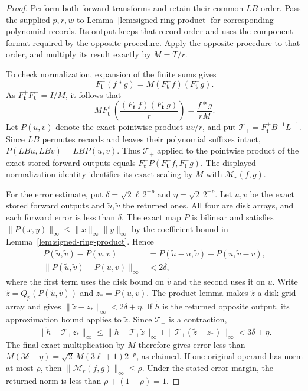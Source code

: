 \documentclass[11pt]{article}
\theoremstyle{definition}
\begin{document}
\begin{proof}
Perform both forward transforms and retain their common $LB$ order.
Pass the supplied $p,r,w$ to
Lemma~\ref{lem:signed-ring-product} for corresponding polynomial records.
Its output keeps that record order and uses the component format
required by the opposite procedure. Apply the opposite procedure
to that order, and multiply its result exactly by $M=T/r$.

To check normalization, expansion of the finite sums gives
\[
 F_{\boldsymbol t}^-(f*g)
       =M(F_{\boldsymbol t}^-f)(F_{\boldsymbol t}^-g).
\]
As $F_{\boldsymbol t}^+F_{\boldsymbol t}^-=I/M$, it follows that
\[
 M F_{\boldsymbol t}^+
       \left(\frac{(F_{\boldsymbol t}^-f)
                          (F_{\boldsymbol t}^-g)}r\right)
       =\frac{f*g}{rM}.
\]
Let $P(u,v)$ denote the exact pointwise product $uv/r$, and put
$\mathcal T_+=F_{\boldsymbol t}^+B^{-1}L^{-1}$.
Since $LB$ permutes records and leaves their polynomial suffixes
intact, $P(LBu,LBv)=LBP(u,v)$.  Thus $\mathcal T_+$ applied to the
pointwise product of the exact stored forward outputs equals
$F_{\boldsymbol t}^+P(F_{\boldsymbol t}^-f,F_{\boldsymbol t}^-g)$.
The displayed normalization identity identifies its exact scaling
by $M$ with $\mathcal M_r(f,g)$.

For the error estimate, put
$\delta=\sqrt2\ell\,2^{-p}$ and $\eta=\sqrt2\,2^{-p}$.
Let $u,v$ be the exact stored forward outputs and
$\widetilde u,\widetilde v$ the returned ones.  All four are disk
arrays, and each forward error is less than $\delta$.
The exact map $P$ is bilinear and satisfies
$\|P(x,y)\|_\infty\leq\|x\|_\infty\|y\|_\infty$ by the coefficient
bound in Lemma~\ref{lem:signed-ring-product}.  Hence
\[
\begin{split}
 P(\widetilde u,\widetilde v)-P(u,v)
   &=P(\widetilde u-u,\widetilde v)+P(u,\widetilde v-v),\\
 \|P(\widetilde u,\widetilde v)-P(u,v)\|_\infty
   &<2\delta,
\end{split}
\]
where the first term uses the disk bound on $\widetilde v$ and the
second uses it on $u$.  Write
$\widetilde z=Q_p(P(\widetilde u,\widetilde v))$ and $z_*=P(u,v)$.
The product lemma makes $\widetilde z$ a disk grid array and gives
$\|\widetilde z-z_*\|_\infty<2\delta+\eta$.
If $\widetilde h$ is the returned opposite output, its approximation
bound applies to $\widetilde z$.  Since $\mathcal T_+$ is a contraction,
\[
 \|\widetilde h-\mathcal T_+ z_*\|_\infty
 \leq\|\widetilde h-\mathcal T_+\widetilde z\|_\infty
       +\|\mathcal T_+(\widetilde z-z_*)\|_\infty
 <3\delta+\eta.
\]
The final exact multiplication by $M$ therefore gives error less than
$M(3\delta+\eta)=\sqrt2\,M(3\ell+1)2^{-p}$, as claimed.
If one original operand has norm at most $\rho$, then
$\|\mathcal M_r(f,g)\|_\infty\leq\rho$.  Under the stated error
margin, the returned norm is less than $\rho+(1-\rho)=1$.


\end{proof}
\end{document}
